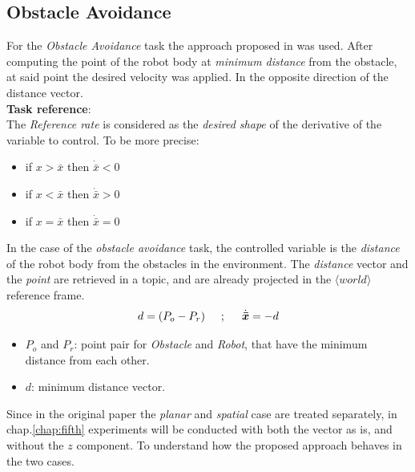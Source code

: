 \subsection{Obstacle Avoidance}
For the \textit{Obstacle Avoidance} task the approach proposed in \cite{maciejewski1985obstacle} was used. After computing the point of the robot body at \textit{minimum distance} from the obstacle, at said point the desired velocity was applied. In the opposite direction of the distance vector.
\\ \noindent \textbf{Task reference}:\\
\noindent The \textit{Reference rate} is considered as the \textit{desired shape} of the derivative of the variable to control.
To be more precise:
\begin{itemize}
	\item if $x > \bar{x}$ then $\dot{\bar{x}} < 0$
	\item if $x < \bar{x}$ then $\dot{\bar{x}} > 0$
	\item if $x = \bar{x}$ then $\dot{\bar{x}} = 0$
\end{itemize}
In the case of the \textit{obstacle avoidance} task, the controlled variable is the \textit{distance} of the robot body from the obstacles in the environment.
\noindent The \textit{distance} vector and the \textit{point} are retrieved in a topic, and are already projected in the $\langle\textit{world}\rangle$ reference frame.\\
\begin{equation}
	d = (P_o - P_r)\hspace{0.5cm};\hspace{0.5cm}\dot{\vec{\bar{x}}} = -d
\end{equation}
\begin{itemize}
	\item $P_o$ and $P_r$: point pair for \textit{Obstacle} and \textit{Robot}, that have the minimum distance from each other.
	\item $d$: minimum distance vector.
\end{itemize}
Since in the original paper the \textit{planar} and \textit{spatial} case are treated separately, in chap.\ref{chap:fifth} experiments will be conducted with both the vector as is, and without the $z$ component. To understand how the proposed approach behaves in the two cases. \\

